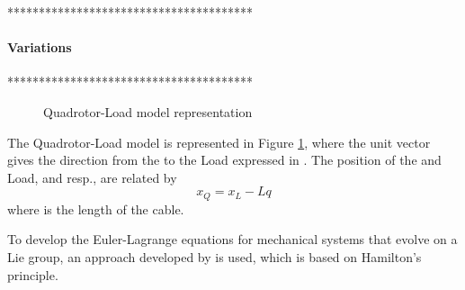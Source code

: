 ***************************************\\
\paragraph{Variations}
***************************************\\

\begin{figure}[h!]
	\centering
	\caption{Quadrotor-Load model representation\label{fig:QRLmodel}}
\end{figure}		

The Quadrotor-Load model is represented in Figure \ref{fig:QRLmodel}, where the unit vector  gives the direction from the  to the Load expressed in \BF.
The position of the  and Load,  and  resp., are related by
\begin{equation}\label{eq:xQ2xL}
x_Q=x_L-Lq
\end{equation}
where  is the length of the cable.



To develop the Euler-Lagrange equations for mechanical systems that evolve on a Lie group, an approach developed by \cite{Lee2008,Lee2005,Lee2009,Lee2011} is used, which is based on Hamilton's principle. 

